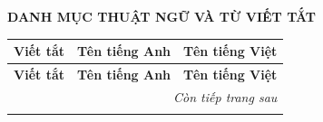 \documentclass[../BTL.tex]{subfiles}
\begin{document}
\newpage

{}

\begin{center}
    {\textbf{DANH MỤC THUẬT NGỮ VÀ TỪ VIẾT TẮT}}
\end{center}


\begin{longtable}{|l|p{6cm}|p{7cm}|}
	\hline
	\textbf{Viết tắt} & \textbf{Tên tiếng Anh} & \textbf{Tên tiếng Việt} \\
	\hline \endfirsthead

	\hline
	\textbf{Viết tắt} & \textbf{Tên tiếng Anh} & \textbf{Tên tiếng Việt} \\
	\hline \endhead

	\hline
	\multicolumn{3}{r}{\textit{Còn tiếp trang sau}} \\
	\hline \endfoot

	\hline \endlastfoot


\end{longtable}
\end{document}
